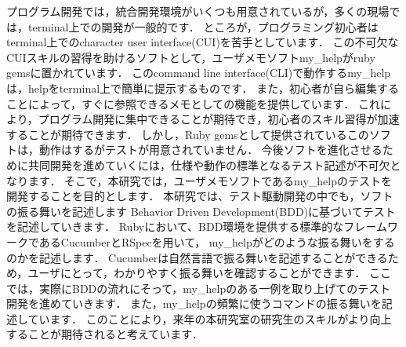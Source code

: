 プログラム開発では，統合開発環境がいくつも用意されているが，多くの現場では，terminal上での開発が一般的です．
ところが，プログラミング初心者はterminal上でのcharacter user interface(CUI)を苦手としています．
この不可欠なCUIスキルの習得を助けるソフトとして，ユーザメモソフトmy\_helpがruby gemsに置かれています．
このcommand line interface(CLI)で動作するmy\_helpは，helpをterminal上で簡単に提示するものです．
また，初心者が自ら編集することによって，すぐに参照できるメモとしての機能を提供しています．
これにより，プログラム開発に集中できることが期待でき，初心者のスキル習得が加速することが期待できます．
しかし，Ruby gemsとして提供されているこのソフトは，動作はするがテストが用意されていません．
今後ソフトを進化させるために共同開発を進めていくには，仕様や動作の標準となるテスト記述が不可欠となります．
そこで，本研究では，ユーザメモソフトであるmy\_helpのテストを開発することを目的とします．
本研究では、テスト駆動開発の中でも，ソフトの振る舞いを記述します
Behavior Driven Development(BDD)に基づいてテストを記述していきます．
Rubyにおいて、BDD環境を提供する標準的なフレームワークであるCucumberとRSpecを用いて，
my\_helpがどのような振る舞いをするのかを記述します．
Cucumberは自然言語で振る舞いを記述することができるため，ユーザにとって，わかりやすく振る舞いを確認することができます．
ここでは，実際にBDDの流れにそって，my\_helpのある一例を取り上げてのテスト開発を進めていきます．
また，my\_helpの頻繁に使うコマンドの振る舞いを記述しています．
このことにより，来年の本研究室の研究生のスキルがより向上することが期待されると考えています．

